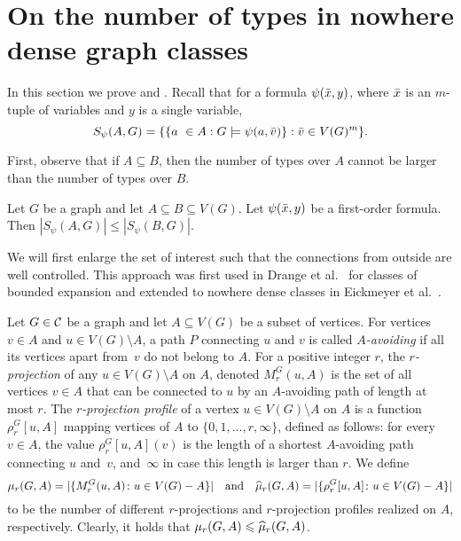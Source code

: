 \section{On the number of types in nowhere dense graph classes}

In this section we prove  and . Recall that for a
formula $\psi(\bar{x},y)$, where 
$\bar{x}$ is an $m$-tuple of variables and $y$ is a single variable, 
\[S_\psi(A,G)=\{\{a\ \in A : G\models\psi(a,\tup v)\} : \tup v\in V(G)^m\}.\]

First, observe that if $A\subseteq B$, then the number of types
over $A$ cannot be larger than the number of types over $B$. 

\begin{lemma}\label{lem:types-over-B}
Let $G$ be a graph and let $A\subseteq B\subseteq V(G)$. Let 
$\psi(\bar{x},y)$ be a first-order formula. Then 
$|S_\psi(A,G)|\leq |S_\psi(B,G)|$. 
\end{lemma}

We will first enlarge the set of interest such 
that the connections from outside are well controlled. This approach
was first used in Drange et al.~\cite{drange2016kernelization} for
classes of bounded expansion and extended to nowhere dense
classes in Eickmeyer et al.~\cite{eickmeyer2016neighborhood}. 

Let $G\in \mathcal{C}$ be a graph and let $A\subseteq V(G)$ be a subset of vertices. For vertices $v\in A$ and $u\in V(G)\setminus A$, a path $P$ connecting $u$ and $v$ is called {\em{$A$-avoiding}}
if all its vertices apart from~$v$ do not belong to $A$. For a positive integer $r$, the {\em{$r$-projection}} of any $u\in V(G)\setminus A$ on $A$, denoted $M^G_r(u,A)$ is the set of all vertices $v\in A$ that
can be connected to $u$ by an $A$-avoiding path of length at most $r$. The {\em{$r$-projection profile}} of a vertex $u\in V(G)\setminus A$ on $A$ is a function $\rho^G_r[u,A]$ mapping vertices of
$A$ to $\{0,1,\ldots,r,\infty\}$, defined as follows: for every $v\in A$, the value $\rho^G_r[u,A](v)$ is the length of a shortest $A$-avoiding path connecting $u$ and~$v$, and~$\infty$ in case this length
is larger than $r$. We define 
\[\mu_r(G,A)=|\{M_r^G(u,A)\colon u\in V(G)- A\}|\quad\textrm{and}\quad \widehat{\mu}_r(G,A)=|\{\rho_r^G[u,A]\colon u\in V(G)- A\}|\]
to be the number of different $r$-projections and $r$-projection profiles realized on $A$, respectively. Clearly, it holds that $\mu_r(G,A)\leqslant \widehat{\mu}_r(G,A)$.

